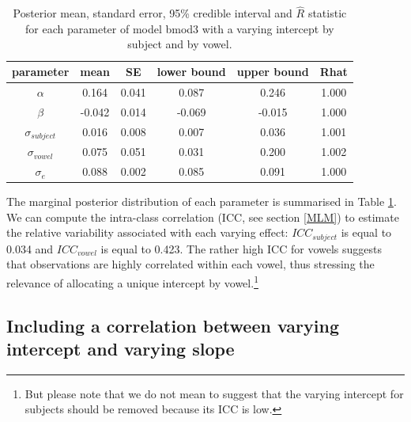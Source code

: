 \documentclass[a4paper,12pt,twoside,onecolumn,openright,final,oldfontcommands]{memoir}
\let\rmarkdownfootnote\footnote%
\def\footnote{\protect\rmarkdownfootnote}
\begin{document}
\begin{table}[H]
\begin{center}
\begin{threeparttable}
\caption{\label{tab:sumbmod3}Posterior mean, standard error, 95\% credible interval and $\hat{R}$
    statistic for each parameter of model bmod3 with a varying intercept by subject and by vowel.}
\small{
\begin{tabular}{cccccc}
\toprule
parameter & \multicolumn{1}{c}{mean} & \multicolumn{1}{c}{SE} & \multicolumn{1}{c}{lower bound} & \multicolumn{1}{c}{upper bound} & \multicolumn{1}{c}{Rhat}\\
\midrule
$\alpha$ & 0.164 & 0.041 & 0.087 & 0.246 & 1.000\\
$\beta$ & -0.042 & 0.014 & -0.069 & -0.015 & 1.000\\
$\sigma_{subject}$ & 0.016 & 0.008 & 0.007 & 0.036 & 1.001\\
$\sigma_{vowel}$ & 0.075 & 0.051 & 0.031 & 0.200 & 1.002\\
$\sigma_{e}$ & 0.088 & 0.002 & 0.085 & 0.091 & 1.000\\
\bottomrule
\end{tabular}
}
\end{threeparttable}
\end{center}
\end{table}

The marginal posterior distribution of each parameter is summarised in Table \ref{tab:sumbmod3}. We can compute the intra-class correlation (ICC, see section \ref{MLM}) to estimate the relative variability associated with each varying effect: \(ICC_{subject}\) is equal to 0.034 and \(ICC_{vowel}\) is equal to 0.423. The rather high ICC for vowels suggests that observations are highly correlated within each vowel, thus stressing the relevance of allocating a unique intercept by vowel.\footnote{But please note that we do not mean to suggest that the varying intercept for subjects should be removed because its ICC is low.}

\hypertarget{including-a-correlation-between-varying-intercept-and-varying-slope}{%
\subsection{Including a correlation between varying intercept and varying slope}\label{including-a-correlation-between-varying-intercept-and-varying-slope}}
\end{document}
